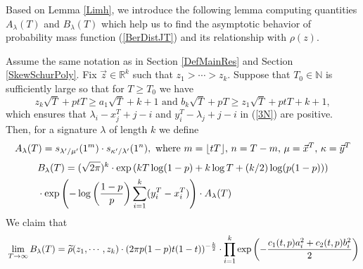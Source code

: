 Based on Lemma \ref{Limh}, we introduce the following lemma computing quantities $A_\lambda(T)$ and $B_{\lambda}(T)$ which help us to find the asymptotic behavior of probability mass function (\ref{BerDistJT}) and its relationship with $\rho(z)$.
\begin{lemma}{\label{ALambdaBLambda}}
	Assume the same notation as in Section \ref{DefMainRes} and Section \ref{SkewSchurPoly}. Fix $\vec{z}\in\mathbb{R}^{k}$ such that $z_1>\cdots>z_k$. Suppose that $T_{0}\in\mathbb{N}$ is sufficiently large so that for $T\geq T_{0}$ we have
$$z_{k}\sqrt{T}+ptT\geq a_1\sqrt{T}+k+1 \text{ and } b_{k}\sqrt{T}+pT\geq z_{1}\sqrt{T}+ptT+k+1,$$ which ensures that $\lambda_{i}-x^{T}_{j}+j-i$ and $y^{T}_{i}-\lambda_{j}+j-i$ in (\ref{3N}) are positive. Then, for a signature $\lambda$ of length $k$ we define
\begin{align}{\label{DefALambda}}
	A_{\lambda}(T)=s_{\lambda^{\prime}/\mu^{\prime}}(1^{m})\cdot s_{\kappa^{\prime}/\lambda^{\prime}}(1^{n}),\text{ where } m=\lfloor tT \rfloor \text{, } n=T-m\text{, }\mu=\vec{x}^{T}\text{, }\kappa=\vec{y}^{T}
\end{align} 
\begin{align}{\label{DefBLambda}}
\begin{split}
	& B_{\lambda}(T)=(\sqrt{2\pi})^{k}\cdot\exp\left(kT\log(1-p)+k\log T +(k/2)\log(p(1-p))\right)\\
	& \cdot \exp\left(-\log\left(\frac{1-p}{p}\right)\sum_{i=1}^{k}(y_{i}^{T}-x_{i}^{T})\right)\cdot A_{\lambda}(T)
\end{split}
\end{align}
We claim that
\begin{align}{\label{BLambda}}
	\lim_{T\rightarrow\infty} B_{\lambda}(T)=\widetilde{\rho}(z_1,\cdots,z_k)\cdot (2\pi p(1-p)t(1-t))^{-\frac{k}{2}}\cdot\prod_{i=1}^{k}\exp\left(-\frac{c_1(t,p)a_i^{2}+c_2(t,p)b_i^2}{2}\right)
\end{align}
\end{lemma}
